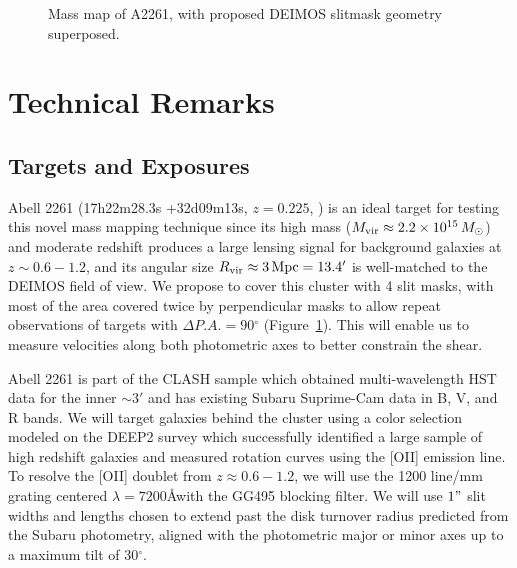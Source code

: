 \documentclass[12pt]{article}
\newcommand{\degr}{\ensuremath{^\circ}}
\begin{document}
\begin{figure}[H]
\begin{minipage}{0.45\linewidth}
\begin{center}
    \caption{\footnotesize Mass map of A2261, with proposed DEIMOS slitmask geometry superposed.}
    \label{fig:maskoverlay}
    \end{center}
  \end{minipage}
\end{figure}


\renewcommand{\bibfont}{\small}
\begin{spacing}{0}


\end{spacing}

\newpage

\section{Technical Remarks}

\subsection{Targets and Exposures}

Abell 2261 (17h22m28.3s +32d09m13s, $z=0.225$, \citealt{Coe2012}) is an ideal target for testing this novel mass mapping technique since its high mass ($M_{\rm vir}\approx 2.2 \times 10^{15}\,M_{\odot}$) and moderate redshift produces a large lensing signal for background galaxies at $z\sim0.6-1.2$, and its angular size $R_{\rm vir} \approx 3\,{\rm Mpc} = 13.4'$ is well-matched to the DEIMOS field of view. We propose to cover this cluster with 4 slit masks, with most of the area covered twice by perpendicular masks to allow repeat observations of targets with $\Delta P.A.=90\degr$ (Figure~\ref{fig:maskoverlay}). This will enable us to measure velocities along both photometric axes to better constrain the shear.

Abell 2261 is part of the CLASH sample \citep{Postman2012} which obtained multi-wavelength HST data for the inner $\sim3'$ and has existing Subaru Suprime-Cam data in B, V, and R bands. We will target galaxies behind the cluster using a color selection modeled on the DEEP2 survey \citep{Newman2013} which successfully identified a large sample of high redshift galaxies and measured rotation curves using the [OII] emission line. To resolve the [OII] doublet from $z\approx0.6-1.2$, we will use the 1200 line/mm grating centered $\lambda=7200$\AA with the GG495 blocking filter. We will use $1"$ slit widths and lengths chosen to extend past the disk turnover radius predicted from the Subaru photometry, aligned with the photometric major or minor axes up to a maximum tilt of $30\degr$.
\end{document}
